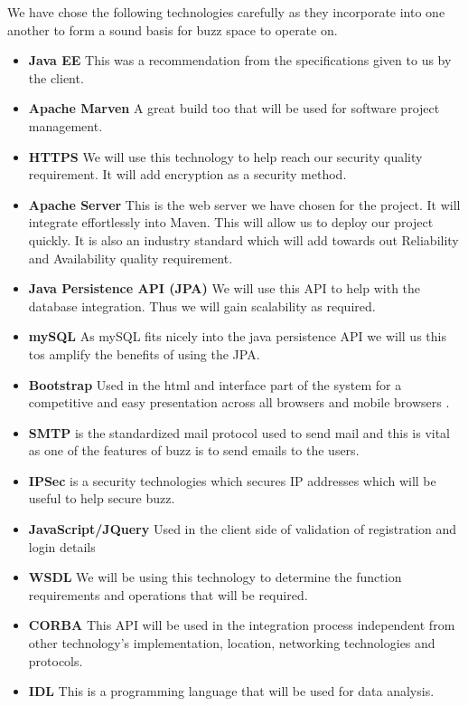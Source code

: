 We have chose the following technologies carefully as they incorporate into one another to form a sound basis for buzz space to operate on.

\begin{itemize}
	\item \textbf{Java EE}
		This was a recommendation from the specifications given to us by the client.
	\item \textbf{Apache Marven}
		A great build too that will be used for software project management.
	\item \textbf{HTTPS}
		We will use this technology to help reach our security quality requirement. It will add encryption as a security method.
	\item \textbf{Apache Server}
		This is the web server we have chosen for the project. It will integrate effortlessly into Maven. This will allow us to deploy our project quickly. It is also an industry standard which will add towards out Reliability and Availability quality requirement. 
	\item \textbf{Java Persistence API (JPA) }
		We will use this API to help with the database integration. Thus we will gain scalability as required.
	\item \textbf{mySQL}
		As mySQL fits nicely into the java persistence API we will us this tos amplify the benefits of using the JPA.
		
		\item \textbf{Bootstrap}
		Used in the html and interface part of the system for a competitive and easy presentation across all browsers 	and mobile browsers .
		\item \textbf{SMTP} is the standardized mail protocol used to send mail and this is vital as one of the features of buzz is to send emails to the users.
		\item \textbf{IPSec} is a security technologies which secures IP addresses which will be useful to help secure buzz.
	\item \textbf{JavaScript/JQuery}
		Used in the client side of validation of registration and login details
	\item \textbf{WSDL} 
		We will be using this technology to determine the function requirements and operations that will be required.
	\item \textbf{CORBA}
		This API will be used in the integration process independent from other technology's implementation, location, networking 	technologies and protocols.
	\item \textbf{IDL}
		This is a programming language that will be used for data analysis. 
		

\end{itemize}
